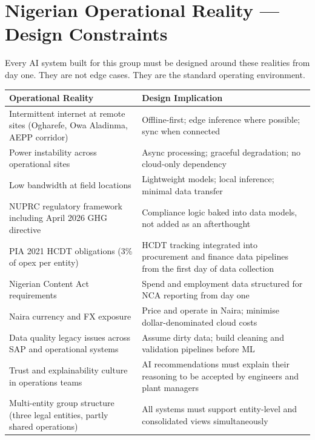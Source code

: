 \documentclass[10pt]{article}
\newcommand{\spacer}{\vspace{10pt}}
\newcommand{\bigspacer}{\vspace{16pt}}
\begin{document}
\bigspacer

\section{Nigerian Operational Reality --- Design Constraints}

Every AI system built for this group must be designed around these realities
from day one. They are not edge cases. They are the standard operating environment.

\spacer
\small
\begin{tabularx}{\columnwidth}{@{}lX@{}}
\toprule
\textbf{Operational Reality} & \textbf{Design Implication} \\
\midrule
Intermittent internet at remote sites (Ogharefe, Owa Aladinma, AEPP corridor)
  & Offline-first; edge inference where possible; sync when connected \\
Power instability across operational sites
  & Async processing; graceful degradation; no cloud-only dependency \\
Low bandwidth at field locations
  & Lightweight models; local inference; minimal data transfer \\
NUPRC regulatory framework including April 2026 GHG directive
  & Compliance logic baked into data models, not added as an afterthought \\
PIA 2021 HCDT obligations (3\% of opex per entity)
  & HCDT tracking integrated into procurement and finance data pipelines
    from the first day of data collection \\
Nigerian Content Act requirements
  & Spend and employment data structured for NCA reporting from day one \\
Naira currency and FX exposure
  & Price and operate in Naira; minimise dollar-denominated cloud costs \\
Data quality legacy issues across SAP and operational systems
  & Assume dirty data; build cleaning and validation pipelines before ML \\
Trust and explainability culture in operations teams
  & AI recommendations must explain their reasoning to be accepted by
    engineers and plant managers \\
Multi-entity group structure (three legal entities, partly shared operations)
  & All systems must support entity-level and consolidated views simultaneously \\
\bottomrule
\end{tabularx}
\normalsize
\end{document}
